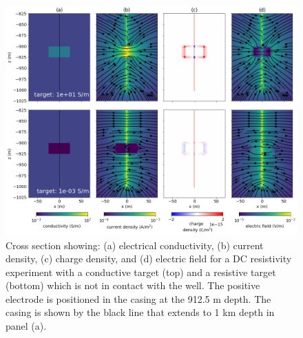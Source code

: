 \begin{figure}
    \begin{center}
    \includegraphics[width=\textwidth]{figures/offset_target_physics.png}
    \end{center}
\caption{
    Cross section showing: (a) electrical conductivity, (b) current density, (c) charge density, and
    (d) electric field for a DC resistivity experiment with a conductive target (top)
    and a resistive target (bottom) which is not in contact with the well.
    The positive electrode is positioned in the casing at the 912.5 m depth.
    The casing is shown by the black line that extends to 1 km
    depth in panel (a).
}
\label{fig:offset_target_physics}
\end{figure}
